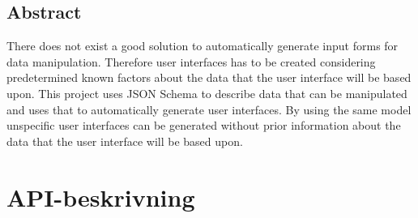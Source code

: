 \documentclass[10pt,a4paper,titlepage,twoside]{report}
\begin{document}
\section*{Abstract}
There does not exist a good solution to automatically generate input forms for data manipulation. Therefore user interfaces has to be created considering predetermined known factors about the data that the user interface will be based upon. This project uses JSON Schema to describe data that can be manipulated and uses that to automatically generate user interfaces. By using the same model unspecific user interfaces can be generated without prior information about the data that the user interface will be based upon.

\clearpage

\setlength{\parskip}{0pt}

\tableofcontents

\setlength{\parskip}{\baselineskip}


\mainmatter








\printbibliography[heading=bibintoc] %

\appendix

\chapter{API-beskrivning}
\label{appendix:api-beskrivning}
\end{document}
